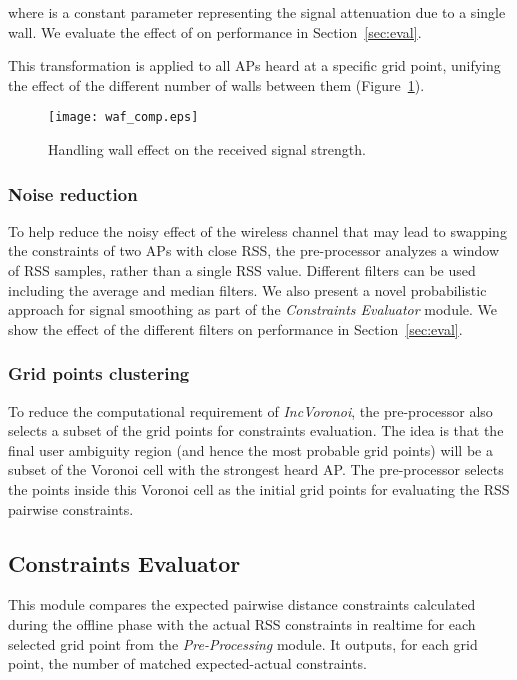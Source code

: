 \documentclass[conference]{IEEEtran}
\def \sys {\textit{IncVoronoi}}
\begin{document}
where  is a constant parameter representing the signal attenuation due to a single wall. We evaluate the effect of  on performance in Section~\ref{sec:eval}.

This transformation is applied to all APs heard at a specific grid point, unifying the effect of the different number of walls between them (Figure~\ref{fig:WAF_comp}).

\begin{figure}[!t]
\centering
\texttt{[image: waf\_comp.eps]}
\caption{Handling wall effect on the received signal strength.
}
\label{fig:WAF_comp}
\end{figure}

\subsubsection{Noise reduction}
\label{sec:noise}

To help reduce the noisy effect of the wireless channel that may lead to swapping the constraints of two APs with close RSS, the pre-processor analyzes a window  of RSS samples, rather than a single RSS value. Different filters can be used including the average and median filters. We also present a novel probabilistic approach for signal smoothing as part of the \emph{Constraints Evaluator} module. 
We show the effect of the different filters on performance in Section~\ref{sec:eval}.
\subsubsection{Grid points clustering}
To reduce the computational requirement of \sys{}, the pre-processor also selects a subset of the grid points for constraints evaluation. The idea is that the final user ambiguity region (and hence the most probable grid points) will be a subset of the Voronoi cell with the strongest heard AP. The pre-processor selects the points inside this Voronoi cell as the initial grid points for evaluating the RSS pairwise constraints. 

\subsection{Constraints Evaluator}
This module compares the expected pairwise distance constraints calculated during the offline phase with the actual RSS constraints in realtime for each selected grid point from the \emph{Pre-Processing} module. It outputs, for each grid point, the number of matched expected-actual constraints. 
\end{document}
